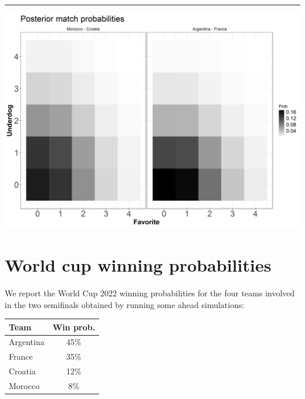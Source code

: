 \documentclass[
  10pt,
]{article}
\begin{document}
\begin{center}\rule{0.5\linewidth}{0.5pt}\end{center}

\begin{center}\includegraphics[width=0.8\linewidth]{figs/data2-1} \end{center}

\newpage
\section{World cup winning probabilities}

We report the World Cup 2022 winning probabilities for the four teams involved in the two semifinals obtained by running some ahead simulations:


\begin{center}
\begin{table}[H]
\begin{tabular}{lc}
Team & Win prob. \\
\toprule
Argentina & 45\% \\ 
France &  35\% \\
Croatia & 12\% \\
Morocco & 8\% \\
\bottomrule
\end{tabular} 
\end{table}
\end{center}
\end{document}
